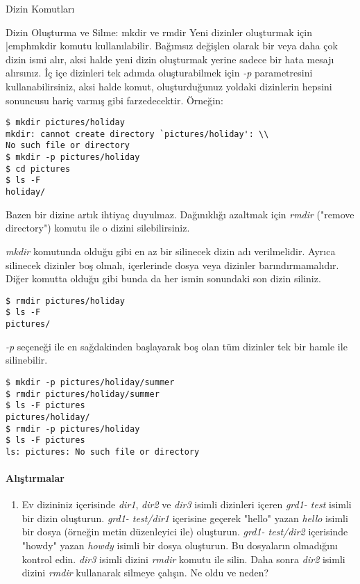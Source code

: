 \begin{section}{Dizin Komutları}
\begin{subsection}{Dizin Oluşturma ve Silme: mkdir ve rmdir}
Yeni dizinler oluşturmak için |emph{mkdir} komutu kullanılabilir. Bağımsız değişlen olarak bir veya daha çok dizin ismi alır, aksi halde yeni dizin oluşturmak yerine sadece bir hata mesajı alırsınız. İç içe dizinleri tek adımda oluşturabilmek için \emph{-p} parametresini kullanabilirsiniz, aksi halde komut, oluşturduğunuz yoldaki dizinlerin hepsini sonuncusu hariç varmış gibi farzedecektir. Örneğin:
\footnotesize 
\begin{verbatim}
$ mkdir pictures/holiday
mkdir: cannot create directory `pictures/holiday': \\
No such file or directory
$ mkdir -p pictures/holiday
$ cd pictures
$ ls -F
holiday/
\end{verbatim}
\normalsize 

Bazen bir dizine artık ihtiyaç duyulmaz. Dağınıklığı azaltmak için \emph{rmdir} ("remove directory") komutu ile o dizini silebilirsiniz.

\emph{mkdir} komutunda olduğu gibi en az bir silinecek dizin adı verilmelidir. Ayrıca silinecek dizinler boş olmalı, içerlerinde dosya veya dizinler barındırmamalıdır. Diğer komutta olduğu gibi bunda da her ismin sonundaki son dizin siliniz.
\footnotesize
\begin{verbatim}
$ rmdir pictures/holiday
$ ls -F
pictures/
\end{verbatim}
\normalsize

\emph{-p} seçeneği ile en sağdakinden başlayarak boş olan tüm dizinler tek bir hamle ile silinebilir.

\footnotesize
\begin{verbatim}
$ mkdir -p pictures/holiday/summer
$ rmdir pictures/holiday/summer
$ ls -F pictures
pictures/holiday/
$ rmdir -p pictures/holiday
$ ls -F pictures
ls: pictures: No such file or directory
\end{verbatim}
\normalsize

\paragraph{{\Huge{\PencilLeftDown}}Alıştırmalar}{
\begin{enumerate}
 \item Ev dizininiz içerisinde \emph{dir1}, \emph{dir2} ve \emph{dir3} isimli dizinleri içeren \emph{grd1- test} isimli bir dizin oluşturun. \emph{grd1- test/dir1} içerisine geçerek "hello" yazan \emph{hello} isimli bir dosya (örneğin metin düzenleyici ile) oluşturun. \emph{grd1- test/dir2} içerisinde "howdy" yazan \emph{howdy} isimli bir dosya oluşturun. Bu dosyaların olmadığını kontrol edin. \emph{dir3} isimli dizini \emph{rmdir} komutu ile silin. Daha sonra \emph{dir2} isimli dizini \emph{rmdir} kullanarak silmeye çalışın. Ne oldu ve neden?
\end{enumerate}}
\end{subsection}
\end{section}

